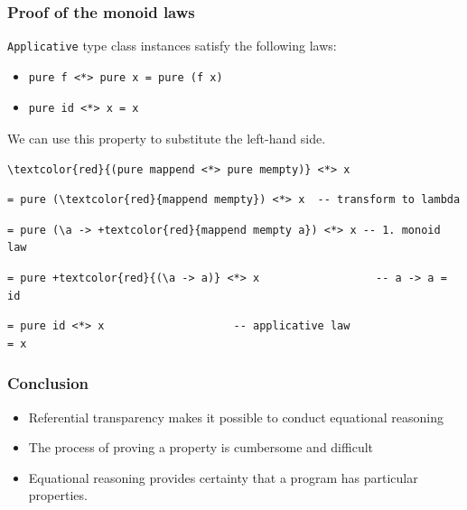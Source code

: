 \documentclass{beamer}
\begin{document}
\begin{frame}[fragile]
  \frametitle{Proof of the monoid laws}
\verb|Applicative| type class instances satisfy the following laws:
\begin{itemize}
\item
\begin{Verbatim}
pure f <*> pure x = pure (f x)
\end{Verbatim}
\item
\begin{Verbatim}
pure id <*> x = x
\end{Verbatim}
\end{itemize}

We can use this property to substitute the left-hand side.
\begin{Verbatim}[commandchars=\\\{\}]
\textcolor{red}{(pure mappend <*> pure mempty)} <*> x   
\end{Verbatim}
\pause
\begin{Verbatim}[commandchars=\\\{\}]
= pure (\textcolor{red}{mappend mempty}) <*> x  -- transform to lambda
\end{Verbatim}
\pause
\begin{Verbatim}[commandchars=+\{\}]
= pure (\a -> +textcolor{red}{mappend mempty a}) <*> x -- 1. monoid law 
\end{Verbatim}
\pause
\begin{Verbatim}[commandchars=+\{\}]
= pure +textcolor{red}{(\a -> a)} <*> x                  -- a -> a = id
\end{Verbatim}
\pause
\begin{Verbatim}
= pure id <*> x                    -- applicative law
= x
\end{Verbatim}

\end{frame}

\begin{frame}
  \frametitle{Conclusion}
  \begin{itemize}
  \item Referential transparency makes it possible to conduct equational reasoning
\item The process of proving a property is cumbersome and difficult
\item Equational reasoning provides certainty that a program has particular properties. 
\end{itemize}

\end{frame}
\end{document}
